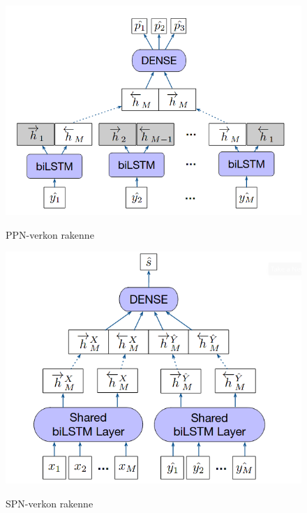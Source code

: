 \documentclass[finnish,twoside,censored,tkt,sw-line]{HYthesisML}
\begin{document}
\begin{figure}[!ht]
    \centering
    \begin{minipage}[b]{0.4\textwidth}
        \centering
        \includegraphics[width=\textwidth]{cmg-property-prediction-network.png}
        \caption{PPN-verkon rakenne}
        {\cite{ShinBonggun}}
        {\label{fig:cmg-model-ppn}}
    \end{minipage}
    \hfill
    \begin{minipage}[b]{0.4\textwidth}
        \centering
        \includegraphics[width=\textwidth]{cmg-similarity-network.png}
        \caption{SPN-verkon rakenne}
        {\cite{ShinBonggun}}
        {\label{fig:cmg-model-spn}}
    \end{minipage}
\end{figure}
\end{document}
